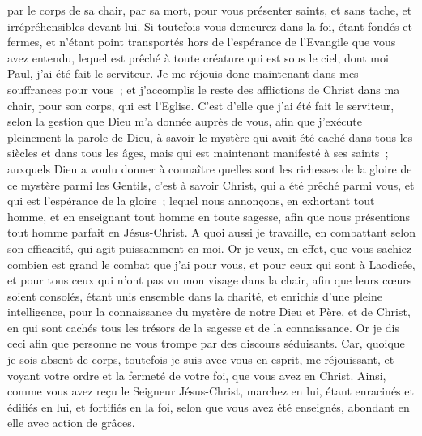 \begin{multicols}{2}
par le corps de sa chair, par sa mort, pour vous présenter saints, et sans tache, et irrépréhensibles devant lui.
Si toutefois vous demeurez dans la foi, étant fondés et fermes, et n'étant point transportés hors de l'espérance de l'Evangile que vous avez entendu, lequel est prêché à toute créature qui est sous le ciel, dont moi Paul, j'ai été fait le serviteur.
Je me réjouis donc maintenant dans mes souffrances pour vous~; et j'accomplis le reste des afflictions de Christ dans ma chair, pour son corps, qui est l'Eglise.
C'est d'elle que j'ai été fait le serviteur, selon la gestion que Dieu m'a donnée auprès de vous, afin que j'exécute pleinement la parole de Dieu,
à savoir le mystère qui avait été caché dans tous les siècles et dans tous les âges, mais qui est maintenant manifesté à ses saints~;
auxquels Dieu a voulu donner à connaître quelles sont les richesses de la gloire de ce mystère parmi les Gentils, c'est à savoir Christ, qui a été prêché parmi vous, et qui est l'espérance de la gloire~; 
lequel nous annonçons, en exhortant tout homme, et en enseignant tout homme en toute sagesse, afin que nous présentions tout homme parfait en Jésus-Christ.
A quoi aussi je travaille, en combattant selon son efficacité, qui agit puissamment en moi.
\VerseOne{}Or je veux, en effet, que vous sachiez combien est grand le combat que j'ai pour vous, et pour ceux qui sont à Laodicée, et pour tous ceux qui n'ont pas vu mon visage dans la chair,
afin que leurs cœurs soient consolés, étant unis ensemble dans la charité, et enrichis d'une pleine intelligence, pour la connaissance du mystère de notre Dieu et Père, et de Christ,
en qui sont cachés tous les trésors de la sagesse et de la connaissance.
Or je dis ceci afin que personne ne vous trompe par des discours séduisants.
Car, quoique je sois absent de corps, toutefois je suis avec vous en esprit, me réjouissant, et voyant votre ordre et la fermeté de votre foi, que vous avez en Christ.
Ainsi, comme vous avez reçu le Seigneur Jésus-Christ, marchez en lui,
étant enracinés et édifiés en lui, et fortifiés en la foi, selon que vous avez été enseignés, abondant en elle avec action de grâces.

\end{multicols}
